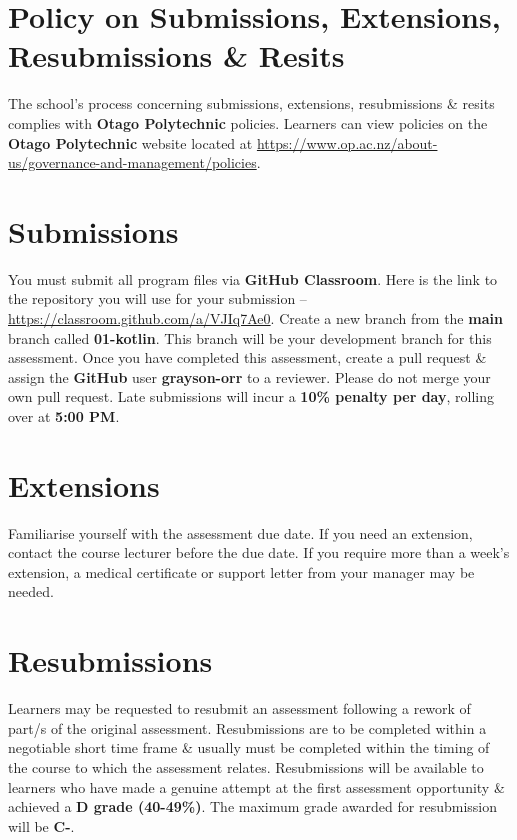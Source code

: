 \documentclass{article}
\begin{document}
\section*{Policy on Submissions, Extensions, Resubmissions \& Resits}
The school's process concerning submissions, extensions, resubmissions \& resits complies with \textbf{Otago Polytechnic} policies. Learners can view policies on the \textbf{Otago Polytechnic} website located at \href{https://www.op.ac.nz/about-us/governance-and-management/policies}{https://www.op.ac.nz/about-us/governance-and-management/policies}.

\section*{Submissions}
You must submit all program files via \textbf{GitHub Classroom}. Here is the link to the repository you will use for your submission – \href{https://classroom.github.com/a/VJIq7Ae0}{https://classroom.github.com/a/VJIq7Ae0}. Create a new branch from the \textbf{main} branch called \textbf{01-kotlin}. This branch will be your development branch for this assessment. Once you have completed this assessment, create a pull request \& assign the \textbf{GitHub} user \textbf{grayson-orr} to a reviewer. Please do not merge your own pull request. Late submissions will incur a \textbf{10\% penalty per day}, rolling over at \textbf{5:00 PM}.

\section*{Extensions}
Familiarise yourself with the assessment due date. If you need an extension, contact the course lecturer before the due date. If you require more than a week's extension, a medical certificate or support letter from your manager may be needed.

\section*{Resubmissions}
Learners may be requested to resubmit an assessment following a rework of part/s of the original assessment. Resubmissions are to be completed within a negotiable short time frame \& usually must be completed within the timing of the course to which the assessment relates. Resubmissions will be available to learners who have made a genuine attempt at the first assessment opportunity \& achieved a \textbf{D grade (40-49\%)}. The maximum grade awarded for resubmission will be \textbf{C-}.
\end{document}
